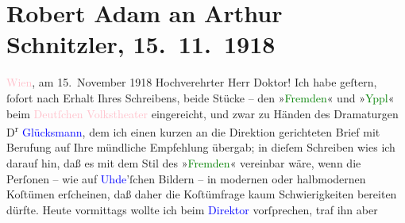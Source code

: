 

               \section[Robert Adam an Arthur Schnitzler, 15. 11. 1918]{ Robert Adam an Arthur Schnitzler, 15. 11. 1918}\nopagebreak{}\rehead{ }\normalsize\beginnumbering{} \toendnotes[C]{\smallbreak\pagebreak[2]} 
\toendnotes[C]{\smallbreak}\pstart
           \raggedleft{}{\pb}\textcolor{pink}{Wien}{}\ledrightnote{\textcolor{pink}{Wien}}, am 15. November 1918\pend
           \pstart\center{}Hochverehrter Herr Doktor!\pend\pstart
           Ich habe geſtern, ſofort nach Erhalt Ihres Schreibens, beide Stücke – den »\textcolor{green}{Fremden}{}\ledrightnote{\textcolor{green}{Der Fremde}}« und »\textcolor{green}{Yppl}{}\ledrightnote{\textcolor{green}{Yppl. Idylle in fünf Akten}}« beim \textcolor{pink}{Deutſchen Volkstheater}{}\ledrightnote{\textcolor{pink}{Volkstheater}}
                    eingereicht, und zwar zu Händen des Dramaturgen D\textsuperscript{r}{ }\textcolor{blue}{Glücksmann}{}\ledrightnote{\textcolor{blue}{Heinrich Glücksmann}}, dem ich einen kurzen an die
                    Direktion gerichteten Brief mit Berufung auf Ihre mündliche Empfehlung übergab;
                    in dieſem Schreiben wies ich darauf hin, daß es mit dem Stil des »\textcolor{green}{Fremden}{}\ledrightnote{\textcolor{green}{Der Fremde}}« vereinbar wäre, wenn die Perſonen –
                    wie auf \textcolor{blue}{Uhde}{}\ledrightnote{\textcolor{blue}{Fritz von Uhde}}’ſchen Bildern – in modernen oder
                    halbmodernen Koſtümen er{\pb}ſcheinen, daß daher die
                    Koſtümfrage kaum Schwierigkeiten bereiten dürfte. Heute vormittags wollte ich
                    beim \textcolor{blue}{Direktor}{}\ledrightnote{\textcolor{blue}{Alfred Bernau}} vorſprechen, traf ihn aber
